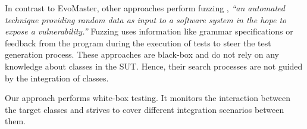 In contrast to EvoMaster, other approaches perform fuzzing \cite{Holler2012}, \textit{``an automated technique providing random data as input to a software system in the hope to expose a vulnerability.''} Fuzzing uses information like grammar specifications \cite{Holler2012, beyene2012, coppit2005, godefroid2008} or feedback from the program during the execution of tests \cite{Padhye2019} to steer the test generation process.
These approaches are black-box and do not rely on any knowledge about classes in the SUT. Hence, their search processes are not guided by the integration of classes.

Our approach performs white-box testing. It monitors the interaction between the target classes and strives to cover different integration scenarios between them.
